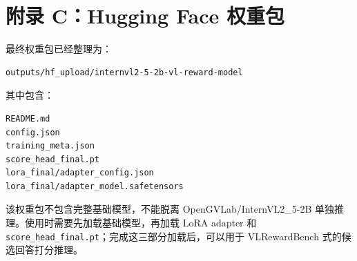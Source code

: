 \documentclass[11pt,a4paper]{ctexart}
\begin{document}
\section*{附录 C：Hugging Face 权重包}

最终权重包已经整理为：

\begin{lstlisting}
outputs/hf_upload/internvl2-5-2b-vl-reward-model
\end{lstlisting}

其中包含：

\begin{lstlisting}
README.md
config.json
training_meta.json
score_head_final.pt
lora_final/adapter_config.json
lora_final/adapter_model.safetensors
\end{lstlisting}

该权重包不包含完整基础模型，不能脱离 OpenGVLab/InternVL2\_5-2B 单独推理。使用时需要先加载基础模型，再加载 LoRA adapter 和 \texttt{score\_head\_final.pt}；完成这三部分加载后，可以用于 VLRewardBench 式的候选回答打分推理。
\end{document}
